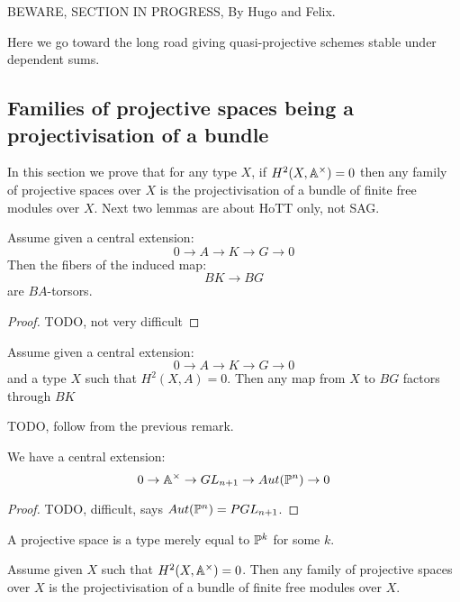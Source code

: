 
BEWARE, SECTION IN PROGRESS, By Hugo and Felix.

Here we go toward the long road giving quasi-projective schemes stable under dependent sums. 


\subsection{Families of projective spaces being a projectivisation of a bundle}

In this section we prove that for any type $X$, if $H^2(X,\mathbb{A}^\times) = 0$ then any family of projective spaces over $X$ is the projectivisation of a bundle of finite free modules over $X$. Next two lemmas are about HoTT only, not SAG.

\begin{lemma}
Assume given a central extension:
\[0 \to A \to K \to G \to 0\]
Then the fibers of the induced map:
\[BK\to BG\]
are $BA$-torsors.
\end{lemma}

\begin{proof}
TODO, not very difficult
\end{proof}

\begin{lemma}\label{trivial-cohomology-lift}
Assume given a central extension:
\[0 \to A \to K \to G \to 0\]
and a type $X$ such that $H^2(X,A)=0$. Then any map from $X$ to $BG$ factors through $BK$
\end{lemma}

\begin{lemma}
TODO, follow from the previous remark.
\end{lemma}

\begin{proposition}\label{auto-projective-central}
We have a central extension:
\[0 \to \mathbb{A}^\times \to GL_{n+1} \to Aut(\mathbb{P}^n) \to 0\]
\end{proposition}

\begin{proof}
TODO, difficult, says $Aut(\mathbb{P}^n) = PGL_{n+1}$.
\end{proof}

A projective space is a type merely equal to $\mathbb{P}^k$ for some $k$.

\begin{corollary}\label{projective-space-are-projectivisation-bundle}
Assume given $X$ such that $H^2(X,\mathbb{A}^\times) = 0$. Then any family of projective spaces over $X$ is the projectivisation of a bundle of finite free modules over $X$.
\end{corollary}

